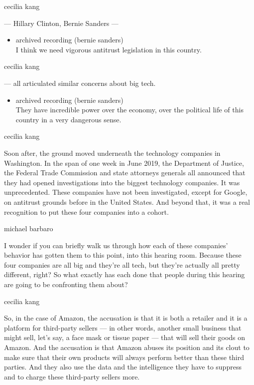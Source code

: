 cecilia kang

--- Hillary Clinton, Bernie Sanders ---

\begin{itemize}
\tightlist
\item
  archived recording (bernie sanders)\\
  I think we need vigorous antitrust legislation in this country.
\end{itemize}

cecilia kang

--- all articulated similar concerns about big tech.

\begin{itemize}
\tightlist
\item
  archived recording (bernie sanders)\\
  They have incredible power over the economy, over the political life
  of this country in a very dangerous sense.
\end{itemize}

cecilia kang

Soon after, the ground moved underneath the technology companies in
Washington. In the span of one week in June 2019, the Department of
Justice, the Federal Trade Commission and state attorneys generals all
announced that they had opened investigations into the biggest
technology companies. It was unprecedented. These companies have not
been investigated, except for Google, on antitrust grounds before in the
United States. And beyond that, it was a real recognition to put these
four companies into a cohort.

michael barbaro

I wonder if you can briefly walk us through how each of these companies'
behavior has gotten them to this point, into this hearing room. Because
these four companies are all big and they're all tech, but they're
actually all pretty different, right? So what exactly has each done that
people during this hearing are going to be confronting them about?

cecilia kang

So, in the case of Amazon, the accusation is that it is both a retailer
and it is a platform for third-party sellers --- in other words, another
small business that might sell, let's say, a face mask or tissue paper
--- that will sell their goods on Amazon. And the accusation is that
Amazon abuses its position and its clout to make sure that their own
products will always perform better than these third parties. And they
also use the data and the intelligence they have to suppress and to
charge these third-party sellers more.

